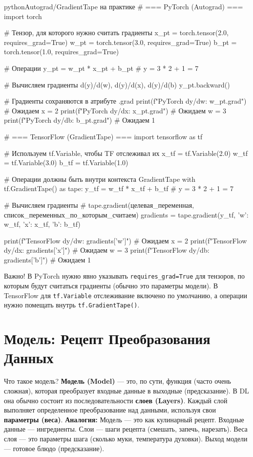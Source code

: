 \begin{codebox}{python}{Autograd/GradientTape на практике}
# === PyTorch (Autograd) ===
import torch

# Тензор, для которого нужно считать градиенты
x_pt = torch.tensor(2.0, requires_grad=True)
w_pt = torch.tensor(3.0, requires_grad=True)
b_pt = torch.tensor(1.0, requires_grad=True)

# Операции
y_pt = w_pt * x_pt + b_pt # y = 3 * 2 + 1 = 7

# Вычисляем градиенты d(y)/d(w), d(y)/d(x), d(y)/d(b)
y_pt.backward()

# Градиенты сохраняются в атрибуте .grad
print(f"PyTorch dy/dw: {w_pt.grad}") # Ожидаем x = 2
print(f"PyTorch dy/dx: {x_pt.grad}") # Ожидаем w = 3
print(f"PyTorch dy/db: {b_pt.grad}") # Ожидаем 1

# === TensorFlow (GradientTape) ===
import tensorflow as tf

# Используем tf.Variable, чтобы TF отслеживал их
x_tf = tf.Variable(2.0)
w_tf = tf.Variable(3.0)
b_tf = tf.Variable(1.0)

# Операции должны быть внутри контекста GradientTape
with tf.GradientTape() as tape:
    y_tf = w_tf * x_tf + b_tf # y = 3 * 2 + 1 = 7

# Вычисляем градиенты
# tape.gradient(целевая_переменная, список_переменных_по_которым_считаем)
gradients = tape.gradient(y_tf, {'w': w_tf, 'x': x_tf, 'b': b_tf})

print(f"TensorFlow dy/dw: {gradients['w']}") # Ожидаем x = 2
print(f"TensorFlow dy/dx: {gradients['x']}") # Ожидаем w = 3
print(f"TensorFlow dy/db: {gradients['b']}") # Ожидаем 1
\end{codebox}
\begin{alerttextbox}{Важно!}
    В PyTorch нужно явно указывать \texttt{requires\_grad=True} для тензоров, по которым будут считаться градиенты (обычно это параметры модели). В TensorFlow для \texttt{tf.Variable} отслеживание включено по умолчанию, а операции нужно помещать внутрь \texttt{tf.GradientTape()}.
\end{alerttextbox}

\section{Модель: Рецепт Преобразования Данных}

\begin{myblock}{Что такое модель?}
    \textbf{Модель (Model)} — это, по сути, функция (часто очень сложная), которая преобразует входные данные в выходные (предсказание). В DL она обычно состоит из последовательности \textbf{слоев (Layers)}. Каждый слой выполняет определенное преобразование над данными, используя свои \textbf{параметры (веса)}.
    \textbf{Аналогия:} Модель — это как кулинарный рецепт. Входные данные — ингредиенты. Слои — шаги рецепта (смешать, запечь, нарезать). Веса слоя — это параметры шага (сколько муки, температура духовки). Выход модели — готовое блюдо (предсказание).
\end{myblock}

